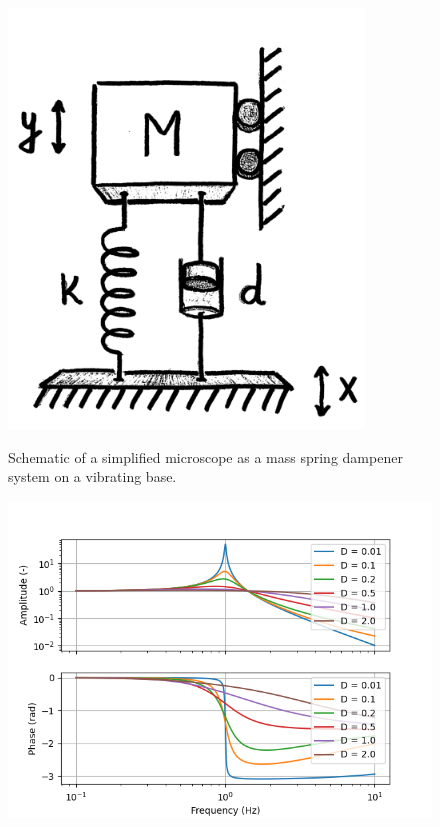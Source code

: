\documentclass[11pt]{article}
\begin{document}
\begin{figure}[H]
  \centering
  \begin{minipage}[b]{0.30\textwidth}
    \includegraphics[width=\textwidth]{img/resonance/simplified_1DOF_oscilator.png}
    \caption{Schematic of a simplified microscope as a mass spring dampener system on a vibrating base. \citep{hesselberthMicroscopieBeweging}}
    \label{fig:1DOFoscilator}
  \end{minipage}
  \hfill
  \begin{minipage}[b]{0.65\textwidth}
    \includegraphics[width=\textwidth]{img/resonance/bode_plot_w01.png}
    \caption{}
    \label{fig:amp_driven_bode}
  \end{minipage}
\end{figure}
\end{document}
